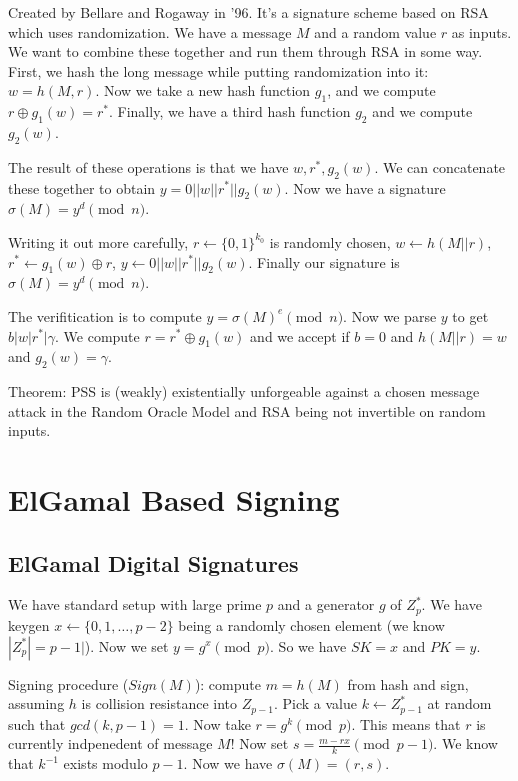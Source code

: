 \documentclass[psamsfonts]{amsart}
\begin{document}
Created by Bellare and Rogaway in '96. It's a signature scheme based on RSA which uses randomization. We have a message $M$ and a random value $r$ as inputs. We want to combine these together and run them through RSA in some way. First, we hash the long message while putting randomization into it: $w = h(M, r)$. Now we take a new hash function $g_1$, and we compute $r \oplus g_1(w) = r^*$. Finally, we have a third hash function $g_2$ and we compute $g_2(w)$.

The result of these operations is that we have $w, r^*, g_2(w)$. We can concatenate these together to obtain $y = 0 || w || r^* || g_2(w)$. Now we have a signature $\sigma(M) = y^d \pmod{n}$.

Writing it out more carefully, $r \leftarrow \{0,1\}^{k_0}$ is randomly chosen, $w \leftarrow h(M || r)$, $r^* \leftarrow g_1(w) \oplus r$, $y \leftarrow 0 || w || r^* || g_2(w)$. Finally our signature is $\sigma(M) = y^d \pmod{n}$.

The verifitication is to compute $y = \sigma(M)^e \pmod{n}$. Now we parse $y$ to get $b | w | r^* | \gamma$. We compute $r = r^* \oplus g_1(w)$ and we accept if $b = 0$ and $h(M || r) = w$ and $g_2(w) = \gamma$.

Theorem: PSS is (weakly) existentially unforgeable against a chosen message attack in the Random Oracle Model and RSA being not invertible on random inputs.

\section{ElGamal Based Signing}

\subsection{ElGamal Digital Signatures}

We have standard setup with large prime $p$ and a generator $g$ of $Z_p^*$. We have keygen $x \leftarrow \{0, 1, \ldots, p-2\}$ being a randomly chosen element (we know $|Z_p^*| = p-1|$). Now we set $y = g^x \pmod{p}$. So we have $SK = x$ and $PK = y$.

Signing procedure ($Sign(M)$): compute $m = h(M)$ from hash and sign, assuming $h$ is collision resistance into $Z_{p-1}$. Pick a value $k \leftarrow Z_{p-1}^*$ at random such that $gcd(k, p-1) = 1$. Now take $r = g^k \pmod{p}$. This means that $r$ is currently indpenedent of message $M$! Now set $s = \frac{m - rx}{k} \pmod{p-1}$. We know that $k^{-1}$ exists modulo $p-1$. Now we have $\sigma(M) = (r,s)$.
\end{document}
